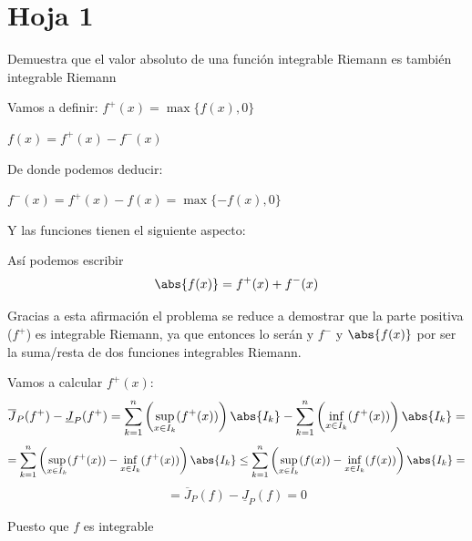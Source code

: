 \section{Hoja 1}
\begin{problem}[1]
Demuestra que el valor absoluto de una función integrable Riemann es también integrable Riemann

\solution

Vamos a definir:
$f^+(x) = \max\lbrace f(x), 0 \rbrace$

$f(x) = f^+(x) - f^-(x)$

De donde podemos deducir:

$f^-(x) = f^+(x)-f(x)=\max \lbrace -f(x), 0 \rbrace$

Y las funciones tienen el siguiente aspecto:

\begin{center}
\end{center}


Así podemos escribir \[ \abs{f(x)} = f^+(x)+f^-(x) \]

Gracias a esta afirmación el problema se reduce a demostrar que la parte positiva ($f^+$) es integrable Riemann, ya que entonces lo serán  y $f^-$  y $\abs{f(x)}$  por ser la suma/resta de dos funciones integrables Riemann.


Vamos a calcular $f^+(x)$:
\[\overline{J}_P(f^+)-\underline{J}_P(f^+) = \sum_{k=1}^n\left(\sup_{x\in I_k}(f^+(x))\right)\abs{I_k} - \sum_{k=1}^n\left(\inf_{x\in I_k}(f^+(x))\right)\abs{I_k}=\]
\[= \sum_{k=1}^n\left(\sup_{x\in I_k}(f^+(x))-\inf_{x\in I_k}(f^+(x))\right)\abs{I_k} \leq
\sum_{k=1}^n\left(\sup_{x\in I_k}(f(x))-\inf_{x\in I_k}(f(x))\right)\abs{I_k} =\] \[=\overline{J}_P(f)-\underline{J}_P(f) = 0\]

Puesto que $f$ es integrable
\end{problem}

